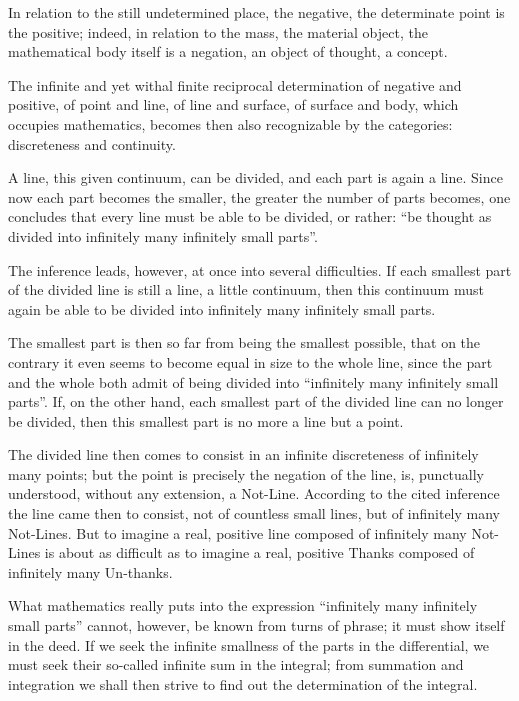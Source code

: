 \documentclass[12pt]{book}
\begin{document}
In relation to the still undetermined place, the negative, the determinate point is
the positive; indeed, in relation to the mass, the material object, the mathematical
body itself is a negation, an object of thought, a concept.

The infinite and yet withal finite reciprocal determination of negative and positive,
of point and line, of line and surface, of surface and body, which occupies
mathematics, becomes then also recognizable by the categories: discreteness and
continuity.

A line, this given continuum, can be divided, and each part is again a line. Since now
each part becomes the smaller, the greater the number of parts becomes, one concludes
that every line must be able to be divided, or rather: ``be thought as divided into
infinitely many infinitely small parts''.

The inference leads, however, at once into several difficulties. If each smallest part
of the divided line is still a line, a little continuum, then this continuum must
again be able to be divided into infinitely many infinitely small parts.

The smallest part is then so far from being the smallest possible, that on the
contrary it even seems to become equal in size to the whole line, since the part and
the whole both admit of being divided into ``infinitely many infinitely small
parts''. If, on the other hand, each smallest part of the divided line can no longer
be divided, then this smallest part is no more a line but a point.

The divided line then comes to consist in an infinite discreteness of infinitely many
points; but the point is precisely the negation of the line, is, punctually
understood, without any extension, a Not-Line. According to the cited inference the
line came then to consist, not of countless small lines, but of infinitely many
Not-Lines. But to imagine a real, positive line composed of infinitely many Not-Lines
is about as difficult as to imagine
a real, positive Thanks composed of infinitely many Un-thanks.

What mathematics really puts into the expression ``infinitely many infinitely small
parts'' cannot, however, be known from turns of phrase; it must show itself in the
deed. If we seek the infinite smallness of the parts in the differential, we must seek
their so-called infinite sum in the integral; from summation and integration we shall
then strive to find out the determination of the integral.
\end{document}
